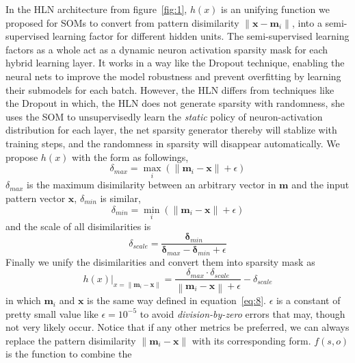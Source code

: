 \documentclass[3p,times,procedia]{elsarticle}
\begin{document}
In the HLN architecture from figure~\ref{fig:1},
$h(x)$ is an unifying function we proposed for 
SOMs to convert from pattern disimilarity
$\|\mathbf{x}-\mathbf{m}_i\|$, into
a semi-supervised learning factor for
different hidden units. The semi-supervised
learning factors as a whole act as a 
dynamic neuron activation sparsity mask for 
each hybrid learning layer.
It works in a way like the Dropout 
technique\cite{srivastava2014dropout}, 
enabling the neural nets 
to improve the model robustness and prevent
overfitting by learning their submodels for 
each batch. However, the HLN differs from 
techniques like the Dropout in which, 
the HLN does not generate sparsity with 
randomness, she uses the SOM
to unsupervisedly learn the \emph{static}
policy of neuron-activation distribution for
each layer, the net sparsity generator thereby
will stablize with training steps, and the
randomness in sparsity will disappear 
automatically.
We propose $h(x)$ with the form as followings,
\begin{equation}
	\delta_{max} = \max_i\left(
	\|\mathbf{m}_i-\mathbf{x}\|+\epsilon
	\right)
	\label{eq:10}
\end{equation}
$\delta_{max}$ is the maximum disimilarity
between an arbitrary vector in $\mathbf{m}$
and the input pattern vector $\mathbf{x}$,
$\delta_{min}$ is similar,
\begin{equation}
	\delta_{min} = \min_i\left(
	\|\mathbf{m}_i-\mathbf{x}\|+\epsilon
	\right)
	\label{eq:11}
\end{equation}
and the scale of all disimilarities is
\begin{equation}
	\delta_{scale} = 
	\frac{\mathbf{\delta}_{min}}
	{\mathbf{\delta}_{max}-
	\mathbf{\delta}_{min} + \epsilon}
	\label{eq:12}
\end{equation}
Finally we unify the disimilarities and convert
them into sparsity mask as
\begin{equation}
	h(x)|_{x=\|\mathbf{m}_i-\mathbf{x}\|}=
	\frac{\delta_{max}\cdot\delta_{scale}}
	{\left\|\mathbf{m}_i-\mathbf{x}\right\|
	+\epsilon}-\delta_{scale}
	\label{eq:13}
\end{equation}
in which $\mathbf{m}_i$ and $\mathbf{x}$ is the
same way defined in equation~\ref{eq:8}.
$\epsilon$ is a constant of pretty small value
like $\epsilon=10^{-5}$ to avoid 
\emph{division-by-zero} errors that may, 
though not very likely occur. Notice that
if any other metrics be preferred, we can
always replace the pattern disimilarity
$\|\mathbf{m}_i-\mathbf{x}\|$ with its
corresponding form.
$f(s,o)$ is the function to combine the 
\end{document}
